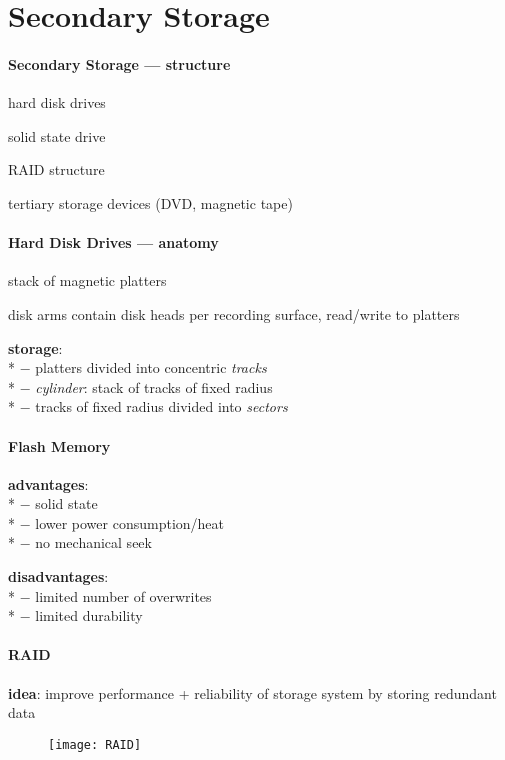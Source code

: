 \section{Secondary Storage}

\paragraph{Secondary Storage --- structure}
\begin{items}
  \item hard disk drives
  \item solid state drive
  \item RAID structure
  \item tertiary storage devices (DVD, magnetic tape)
\end{items}

\paragraph{Hard Disk Drives --- anatomy}
\begin{items}
  \item stack of magnetic platters
  \item disk arms contain disk heads per recording surface, read/write to platters
  \item \textbf{storage}: \\*
    $ - $ platters divided into concentric \emph{tracks} \\*
    $ - $ \emph{cylinder}: stack of tracks of fixed radius \\*
    $ - $ tracks of fixed radius divided into \emph{sectors}
\end{items}

\paragraph{Flash Memory}
\begin{items}
  \item \textbf{advantages}: \\*
    $ - $ solid state \\*
    $ - $ lower power consumption/heat \\*
    $ - $ no mechanical seek
  \item \textbf{disadvantages}: \\*
    $ - $ limited number of overwrites \\*
    $ - $ limited durability
\end{items}

\paragraph{RAID}
\begin{items}
  \item \textbf{idea}: improve performance + reliability of storage system by storing redundant data
\end{items}
\begin{figure}[H]\centering\label{RAID}\texttt{[image: RAID]}\end{figure}